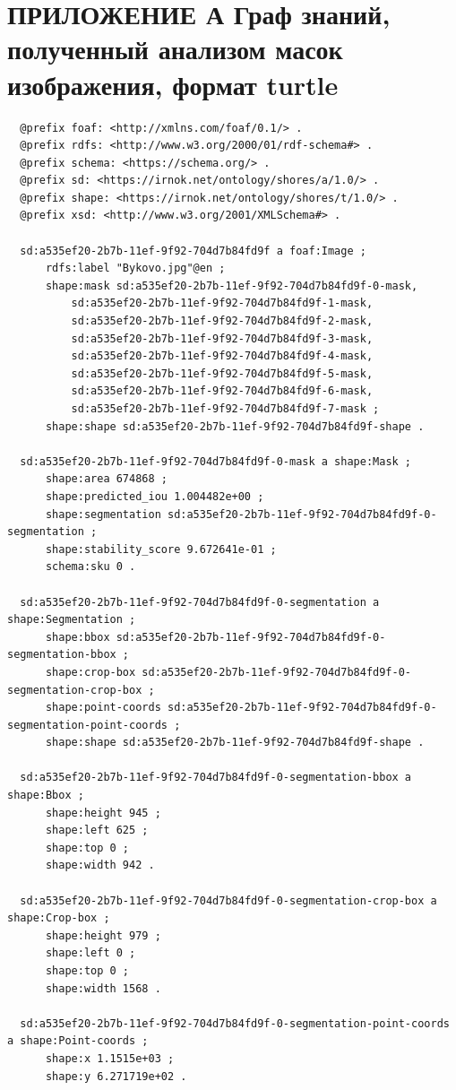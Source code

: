 \documentclass[732,14pt,final]{studrep}
\begin{document}
\chapter*{ПРИЛОЖЕНИЕ А Граф знаний, полученный анализом масок изображения, формат turtle}
\begin{verbatim}
  @prefix foaf: <http://xmlns.com/foaf/0.1/> .
  @prefix rdfs: <http://www.w3.org/2000/01/rdf-schema#> .
  @prefix schema: <https://schema.org/> .
  @prefix sd: <https://irnok.net/ontology/shores/a/1.0/> .
  @prefix shape: <https://irnok.net/ontology/shores/t/1.0/> .
  @prefix xsd: <http://www.w3.org/2001/XMLSchema#> .
  
  sd:a535ef20-2b7b-11ef-9f92-704d7b84fd9f a foaf:Image ;
      rdfs:label "Bykovo.jpg"@en ;
      shape:mask sd:a535ef20-2b7b-11ef-9f92-704d7b84fd9f-0-mask,
          sd:a535ef20-2b7b-11ef-9f92-704d7b84fd9f-1-mask,
          sd:a535ef20-2b7b-11ef-9f92-704d7b84fd9f-2-mask,
          sd:a535ef20-2b7b-11ef-9f92-704d7b84fd9f-3-mask,
          sd:a535ef20-2b7b-11ef-9f92-704d7b84fd9f-4-mask,
          sd:a535ef20-2b7b-11ef-9f92-704d7b84fd9f-5-mask,
          sd:a535ef20-2b7b-11ef-9f92-704d7b84fd9f-6-mask,
          sd:a535ef20-2b7b-11ef-9f92-704d7b84fd9f-7-mask ;
      shape:shape sd:a535ef20-2b7b-11ef-9f92-704d7b84fd9f-shape .
  
  sd:a535ef20-2b7b-11ef-9f92-704d7b84fd9f-0-mask a shape:Mask ;
      shape:area 674868 ;
      shape:predicted_iou 1.004482e+00 ;
      shape:segmentation sd:a535ef20-2b7b-11ef-9f92-704d7b84fd9f-0-segmentation ;
      shape:stability_score 9.672641e-01 ;
      schema:sku 0 .
  
  sd:a535ef20-2b7b-11ef-9f92-704d7b84fd9f-0-segmentation a shape:Segmentation ;
      shape:bbox sd:a535ef20-2b7b-11ef-9f92-704d7b84fd9f-0-segmentation-bbox ;
      shape:crop-box sd:a535ef20-2b7b-11ef-9f92-704d7b84fd9f-0-segmentation-crop-box ;
      shape:point-coords sd:a535ef20-2b7b-11ef-9f92-704d7b84fd9f-0-segmentation-point-coords ;
      shape:shape sd:a535ef20-2b7b-11ef-9f92-704d7b84fd9f-shape .
  
  sd:a535ef20-2b7b-11ef-9f92-704d7b84fd9f-0-segmentation-bbox a shape:Bbox ;
      shape:height 945 ;
      shape:left 625 ;
      shape:top 0 ;
      shape:width 942 .
  
  sd:a535ef20-2b7b-11ef-9f92-704d7b84fd9f-0-segmentation-crop-box a shape:Crop-box ;
      shape:height 979 ;
      shape:left 0 ;
      shape:top 0 ;
      shape:width 1568 .
  
  sd:a535ef20-2b7b-11ef-9f92-704d7b84fd9f-0-segmentation-point-coords a shape:Point-coords ;
      shape:x 1.1515e+03 ;
      shape:y 6.271719e+02 .
  

\end{verbatim}
\end{document}
